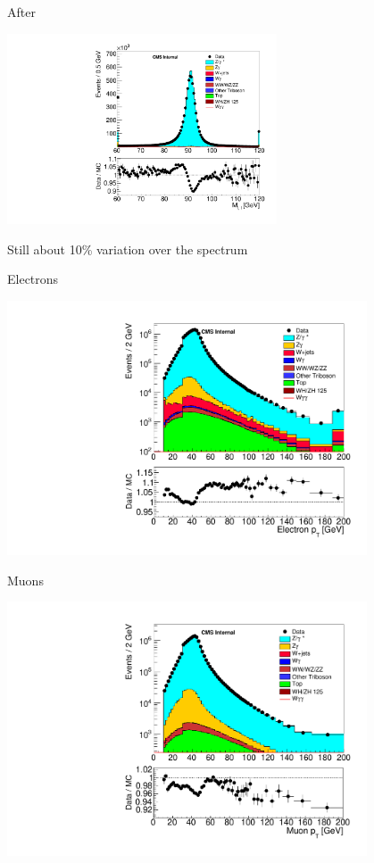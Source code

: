 \documentclass{beamer}
\begin{document}
{        After

        \includegraphics[width=0.6\textwidth]{Plots/m_leplep_mumu_zMassZoom.pdf}

    \ec


}

 {

    Still about 10\% variation over the \pt spectrum


    \bc
        Electrons
   
        \includegraphics[width=0.8\textwidth]{Plots/mu_pt_ee_vetolowmass.pdf}

        Muons

        \includegraphics[width=0.8\textwidth]{Plots/mu_pt_mm_vetolowmass.pdf}

    \ec
}
\end{document}

